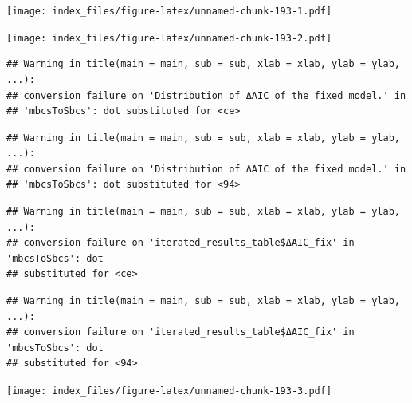 \documentclass[
]{article}
\newenvironment{Shaded}{\begin{snugshade}}{\end{snugshade}}
\newcommand{\AttributeTok}[1]{\textcolor[rgb]{0.77,0.63,0.00}{#1}}
\newcommand{\FunctionTok}[1]{\textcolor[rgb]{0.00,0.00,0.00}{#1}}
\newcommand{\NormalTok}[1]{#1}
\newcommand{\SpecialCharTok}[1]{\textcolor[rgb]{0.00,0.00,0.00}{#1}}
\newcommand{\StringTok}[1]{\textcolor[rgb]{0.31,0.60,0.02}{#1}}
\begin{document}
\texttt{[image: index\_files/figure-latex/unnamed-chunk-193-1.pdf]}

\begin{Shaded}
\end{Shaded}

\texttt{[image: index\_files/figure-latex/unnamed-chunk-193-2.pdf]}

\begin{Shaded}
\end{Shaded}

\begin{verbatim}
## Warning in title(main = main, sub = sub, xlab = xlab, ylab = ylab, ...):
## conversion failure on 'Distribution of ΔAIC of the fixed model.' in
## 'mbcsToSbcs': dot substituted for <ce>
\end{verbatim}

\begin{verbatim}
## Warning in title(main = main, sub = sub, xlab = xlab, ylab = ylab, ...):
## conversion failure on 'Distribution of ΔAIC of the fixed model.' in
## 'mbcsToSbcs': dot substituted for <94>
\end{verbatim}

\begin{verbatim}
## Warning in title(main = main, sub = sub, xlab = xlab, ylab = ylab, ...):
## conversion failure on 'iterated_results_table$ΔAIC_fix' in 'mbcsToSbcs': dot
## substituted for <ce>
\end{verbatim}

\begin{verbatim}
## Warning in title(main = main, sub = sub, xlab = xlab, ylab = ylab, ...):
## conversion failure on 'iterated_results_table$ΔAIC_fix' in 'mbcsToSbcs': dot
## substituted for <94>
\end{verbatim}

\texttt{[image: index\_files/figure-latex/unnamed-chunk-193-3.pdf]}

\begin{Shaded}
\end{Shaded}
\end{document}
